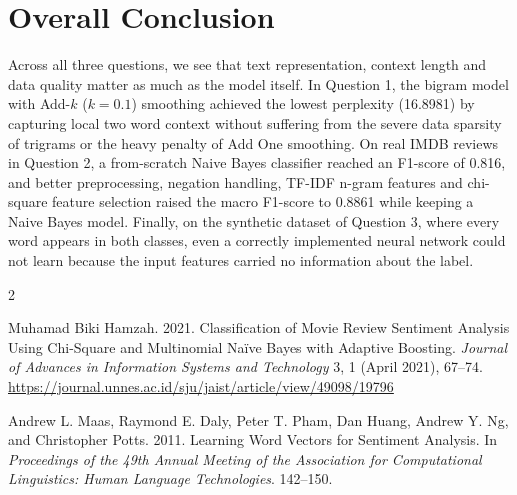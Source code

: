 \documentclass[sigconf]{acmart}
\begin{document}
\section{Overall Conclusion}
Across all three questions, we see that text representation, context length and data quality matter as much as the model itself. In Question 1, the bigram model with Add-$k$ ($k = 0.1$) smoothing achieved the lowest perplexity (16.8981) by capturing local two word context without suffering from the severe data sparsity of trigrams or the heavy penalty of Add One smoothing. On real IMDB reviews in Question 2, a from-scratch Naive Bayes classifier reached an F1-score of 0.816, and better preprocessing, negation handling, TF-IDF n-gram features and chi-square feature selection raised the macro F1-score to 0.8861 while keeping a Naive Bayes model. Finally, on the synthetic dataset of Question 3, where every word appears in both classes, even a correctly implemented neural network could not learn because the input features carried no information about the label.
\begin{thebibliography}{2}

Muhamad Biki Hamzah. 2021.
\newblock Classification of Movie Review Sentiment Analysis Using Chi-Square and Multinomial Na\"{i}ve Bayes with Adaptive Boosting.
\newblock \emph{Journal of Advances in Information Systems and Technology} 3, 1 (April 2021), 67--74.
\newblock \url{https://journal.unnes.ac.id/sju/jaist/article/view/49098/19796}

Andrew L. Maas, Raymond E. Daly, Peter T. Pham, Dan Huang, Andrew Y. Ng, and Christopher Potts. 2011.
\newblock Learning Word Vectors for Sentiment Analysis.
\newblock In \emph{Proceedings of the 49th Annual Meeting of the Association for Computational Linguistics: Human Language Technologies}. 142--150.

\end{thebibliography}
\end{document}
